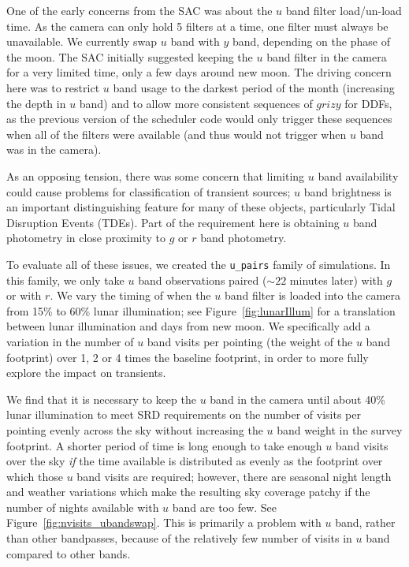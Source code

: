One of the early concerns from the SAC was about the $u$ band filter load/un-load time. As the camera can only hold 5 filters at a time, one filter must always be unavailable. We currently swap $u$ band with $y$ band, depending on the phase of the moon. The SAC initially suggested keeping the $u$ band filter in the camera for a very limited time, only a few days around new moon. The driving concern here was to restrict $u$ band usage to the darkest period of the month (increasing the depth in $u$ band) and to allow more consistent sequences of $grizy$ for DDFs, as the previous version of the scheduler code would only trigger these sequences when all of the filters were available (and thus would not trigger when $u$ band was in the camera). 

As an opposing tension, there was some concern that limiting $u$ band availability could cause problems for classification of transient sources; $u$ band brightness is an important distinguishing feature for many of these objects, particularly Tidal Disruption Events (TDEs). Part of the requirement here is obtaining $u$ band photometry in close proximity to $g$ or $r$ band photometry. 

To evaluate all of these issues, we created the {\tt u\_pairs} family of simulations. In this family, we only take $u$ band observations paired ($\sim22$ minutes later) with $g$ or with $r$. We vary the timing of when the $u$ band filter is loaded into the camera from 15\% to 60\% lunar illumination; see Figure~\ref{fig:lunarIllum} for a translation between lunar illumination and days from new moon. We specifically add a variation in the  number of $u$ band visits per pointing (the weight of the $u$ band footprint) over 1, 2 or 4 times the baseline footprint, in order to more fully explore the impact on transients. 

We find that it is necessary to keep the $u$ band in the camera until about 40\% lunar illumination to meet SRD requirements on the number of visits per pointing evenly across the sky without increasing the $u$ band weight in the survey footprint. A shorter period of time is long enough to take enough $u$ band visits over the sky {\it if} the time available is distributed as evenly as the footprint over which those $u$ band visits are required; however, there are seasonal night length and weather variations which make the resulting sky coverage patchy if the number of nights available with $u$ band are too few.  See Figure~\ref{fig:nvisits_ubandswap}.  This is primarily a problem with $u$ band, rather than other bandpasses, because of the relatively few number of visits in $u$ band compared to other bands.

